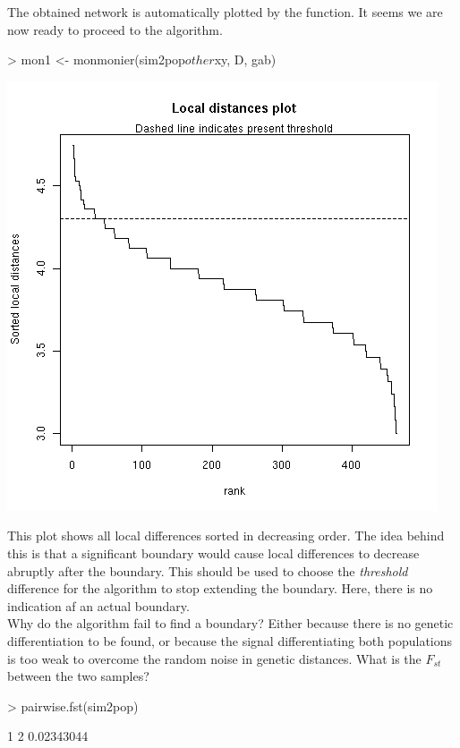 \documentclass{article}
\begin{document}
\noindent The obtained network is automatically plotted by the function.
It seems we are now ready to proceed to the algorithm.
\begin{Schunk}
\begin{Sinput}
> mon1 <- monmonier(sim2pop$other$xy, D, gab)
\end{Sinput}
\end{Schunk}
\begin{center}
\includegraphics[width=.5\textwidth]{figs/monthres1.png}
\end{center}

\noindent This plot shows all local differences sorted in decreasing order.
The idea behind this is that a significant boundary would cause local differences to decrease abruptly after the boundary.
This should be used to choose the \emph{threshold} difference for the algorithm to stop extending
the boundary.
Here, there is no indication af an actual boundary.
\\

Why do the algorithm fail to find a boundary?
Either because there is no genetic differentiation to be found, or because the signal differentiating both populations is too weak to overcome the random noise in genetic distances.
What is the $F_{st}$ between the two samples?
\begin{Schunk}
\begin{Sinput}
> pairwise.fst(sim2pop)
\end{Sinput}
\begin{Soutput}
           1
2 0.02343044
\end{Soutput}
\end{Schunk}
\end{document}
